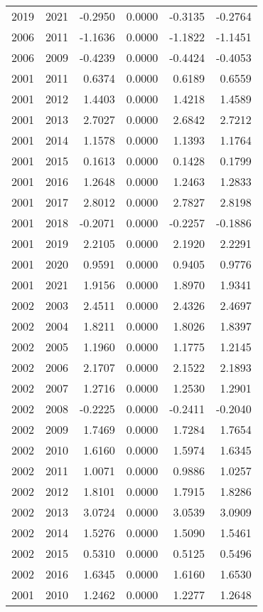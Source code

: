 \begin{tabular}{llrrrr}
2019 & 2021 & -0.2950 & 0.0000 & -0.3135 & -0.2764 \\
2006 & 2011 & -1.1636 & 0.0000 & -1.1822 & -1.1451 \\
2006 & 2009 & -0.4239 & 0.0000 & -0.4424 & -0.4053 \\
2001 & 2011 & 0.6374 & 0.0000 & 0.6189 & 0.6559 \\
2001 & 2012 & 1.4403 & 0.0000 & 1.4218 & 1.4589 \\
2001 & 2013 & 2.7027 & 0.0000 & 2.6842 & 2.7212 \\
2001 & 2014 & 1.1578 & 0.0000 & 1.1393 & 1.1764 \\
2001 & 2015 & 0.1613 & 0.0000 & 0.1428 & 0.1799 \\
2001 & 2016 & 1.2648 & 0.0000 & 1.2463 & 1.2833 \\
2001 & 2017 & 2.8012 & 0.0000 & 2.7827 & 2.8198 \\
2001 & 2018 & -0.2071 & 0.0000 & -0.2257 & -0.1886 \\
2001 & 2019 & 2.2105 & 0.0000 & 2.1920 & 2.2291 \\
2001 & 2020 & 0.9591 & 0.0000 & 0.9405 & 0.9776 \\
2001 & 2021 & 1.9156 & 0.0000 & 1.8970 & 1.9341 \\
2002 & 2003 & 2.4511 & 0.0000 & 2.4326 & 2.4697 \\
2002 & 2004 & 1.8211 & 0.0000 & 1.8026 & 1.8397 \\
2002 & 2005 & 1.1960 & 0.0000 & 1.1775 & 1.2145 \\
2002 & 2006 & 2.1707 & 0.0000 & 2.1522 & 2.1893 \\
2002 & 2007 & 1.2716 & 0.0000 & 1.2530 & 1.2901 \\
2002 & 2008 & -0.2225 & 0.0000 & -0.2411 & -0.2040 \\
2002 & 2009 & 1.7469 & 0.0000 & 1.7284 & 1.7654 \\
2002 & 2010 & 1.6160 & 0.0000 & 1.5974 & 1.6345 \\
2002 & 2011 & 1.0071 & 0.0000 & 0.9886 & 1.0257 \\
2002 & 2012 & 1.8101 & 0.0000 & 1.7915 & 1.8286 \\
2002 & 2013 & 3.0724 & 0.0000 & 3.0539 & 3.0909 \\
2002 & 2014 & 1.5276 & 0.0000 & 1.5090 & 1.5461 \\
2002 & 2015 & 0.5310 & 0.0000 & 0.5125 & 0.5496 \\
2002 & 2016 & 1.6345 & 0.0000 & 1.6160 & 1.6530 \\
2001 & 2010 & 1.2462 & 0.0000 & 1.2277 & 1.2648 \\

\end{tabular}
